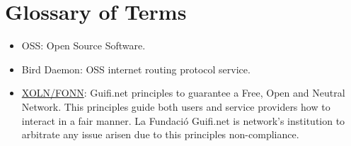 \chapter*{Glossary of Terms}

\begin{itemize}
	\item OSS: Open Source Software.
	\item Bird Daemon: OSS internet routing protocol service.
	\item \href{https://guifi.net/en/FONNC}{XOLN/FONN}: Guifi.net principles to guarantee a Free, Open and Neutral Network. This principles guide both users and service providers how to interact in a fair manner. La Fundaci\'{o} Guifi.net is network's institution to arbitrate any issue arisen due to this principles non-compliance.
\end{itemize}